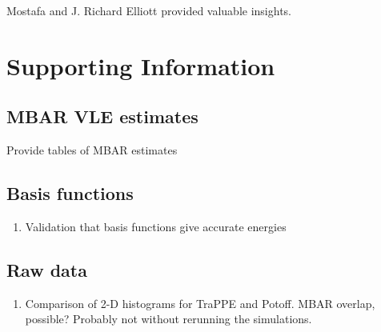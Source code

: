 \documentclass[11pt,a4paper]{article}
\begin{document}
Mostafa and J. Richard Elliott provided valuable insights.

\section{Supporting Information}

\subsection{MBAR VLE estimates}

Provide tables of MBAR estimates

\subsection{Basis functions}

\begin{enumerate}
    \item Validation that basis functions give accurate energies
\end{enumerate}

\subsection{Raw data}

\begin{enumerate}
	\item Comparison of 2-D histograms for TraPPE and Potoff. MBAR overlap, possible? Probably not without rerunning the simulations.
\end{enumerate}
\end{document}
